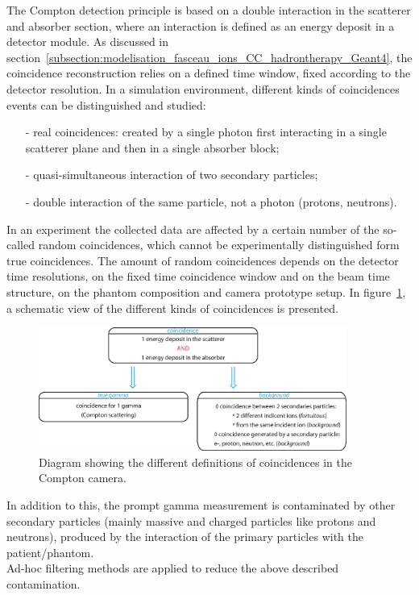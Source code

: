 The Compton detection principle is based on a double interaction in the scatterer and absorber section, where an interaction is defined as an energy deposit in a detector module. As discussed in section~\ref{subsection:modelisation_fasceau_ions_CC_hadrontherapy_Geant4}, the coincidence reconstruction relies on a defined time window, fixed according to the detector resolution. In a simulation environment, different kinds of coincidences events can be distinguished and studied: 
\begin{itemize}
\item[-] real coincidences: created by a single photon first interacting in a single scatterer plane and then in a single absorber block;
\item[-] quasi-simultaneous interaction of two secondary particles;
\item[-] double interaction of the same particle, not a photon (protons, neutrons).
\end{itemize}

In an experiment the collected data are affected by a certain number of the so-called random coincidences, which cannot be experimentally distinguished form true coincidences. The amount of random coincidences depends on the detector time resolutions, on the fixed time coincidence window and on the beam time structure, on the phantom composition and camera prototype setup. In figure~\ref{fig:fig_explication_coincidence_CC_simulation_Hadronth}, a schematic view of the different kinds of coincidences is presented.

\begin{figure}
  \centering
  \includegraphics[width=0.9\textwidth]{./Figure/Schema_coincidence_EN.eps}
  \caption{Diagram showing the different definitions of coincidences in the Compton camera.}
  \label{fig:fig_explication_coincidence_CC_simulation_Hadronth}
\end{figure}

In addition to this, the prompt gamma measurement is contaminated by other secondary particles (mainly massive and charged particles like protons and neutrons), produced by the interaction of the primary particles with the patient/phantom.\\
Ad-hoc filtering methods are applied to reduce the above described contamination.

